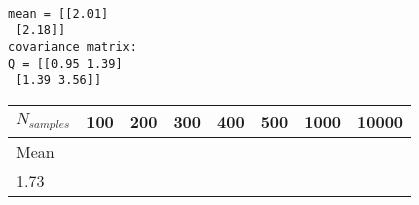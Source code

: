 \documentclass[11pt]{article}
\begin{document}
    \begin{center}
    \end{center}
    { \hspace*{\fill} \\}
    
    \begin{Verbatim}[commandchars=\\\{\}]
mean = [[2.01]
 [2.18]]
covariance matrix:
Q = [[0.95 1.39]
 [1.39 3.56]]

    \end{Verbatim}

    \begin{longtable}[]{@{}llllllll@{}}
\toprule
\begin{minipage}[b]{0.10\columnwidth}\raggedright
\(N_{samples}\)\strut
\end{minipage} & \begin{minipage}[b]{0.10\columnwidth}\raggedright
100\strut
\end{minipage} & \begin{minipage}[b]{0.10\columnwidth}\raggedright
200\strut
\end{minipage} & \begin{minipage}[b]{0.10\columnwidth}\raggedright
300\strut
\end{minipage} & \begin{minipage}[b]{0.10\columnwidth}\raggedright
400\strut
\end{minipage} & \begin{minipage}[b]{0.10\columnwidth}\raggedright
500\strut
\end{minipage} & \begin{minipage}[b]{0.10\columnwidth}\raggedright
1000\strut
\end{minipage} & \begin{minipage}[b]{0.10\columnwidth}\raggedright
10000\strut
\end{minipage}\tabularnewline
\midrule
\endhead
\begin{minipage}[t]{0.10\columnwidth}\raggedright
Mean\strut
\end{minipage} & \begin{minipage}[t]{0.10\columnwidth}\raggedright
\(\begin{array}{cc}1.93\\1.73\end{array}\)\strut
\end{minipage} & \begin{minipage}[t]{0.10\columnwidth}\raggedright

\end{minipage}
\end{longtable}
\end{document}
